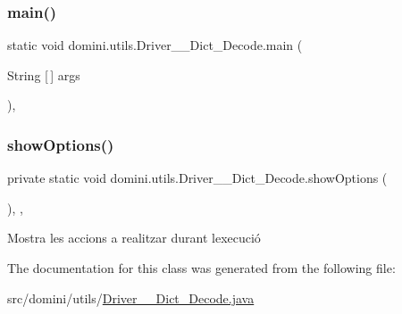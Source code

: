 \subsubsection{\texorpdfstring{main()}{main()}}
{\footnotesize\ttfamily static void domini.\+utils.\+Driver\+\_\+\+\_\+\+Dict\+\_\+\+Decode.\+main (\begin{DoxyParamCaption}\item[{String \mbox{[}$\,$\mbox{]}}]{args }\end{DoxyParamCaption})\hspace{0.3cm}{\ttfamily [inline]}, {\ttfamily [static]}}

\mbox{\label{classdomini_1_1utils_1_1Driver____Dict__Decode_af3ae63bfc55ea99e468d6c9c86ec26c9}} 
\subsubsection{\texorpdfstring{show\+Options()}{showOptions()}}
{\footnotesize\ttfamily private static void domini.\+utils.\+Driver\+\_\+\+\_\+\+Dict\+\_\+\+Decode.\+show\+Options (\begin{DoxyParamCaption}{ }\end{DoxyParamCaption})\hspace{0.3cm}{\ttfamily [inline]}, {\ttfamily [static]}, {\ttfamily [private]}}



Mostra les accions a realitzar durant l\textquotesingle{}execució 



The documentation for this class was generated from the following file\+:\begin{DoxyCompactItemize}
\item 
src/domini/utils/\hyperlink{Driver____Dict__Decode_8java}{Driver\+\_\+\+\_\+\+Dict\+\_\+\+Decode.\+java}\end{DoxyCompactItemize}
